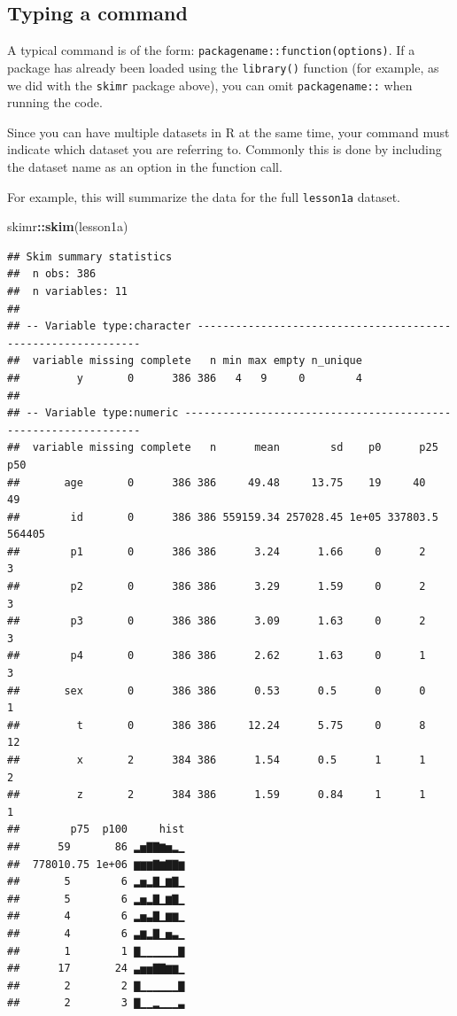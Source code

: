 \documentclass[]{book}
\newenvironment{Shaded}{\begin{snugshade}}{\end{snugshade}}
\newcommand{\KeywordTok}[1]{\textcolor[rgb]{0.13,0.29,0.53}{\textbf{#1}}}
\newcommand{\NormalTok}[1]{#1}
\newcommand{\OperatorTok}[1]{\textcolor[rgb]{0.81,0.36,0.00}{\textbf{#1}}}
\begin{document}
\hypertarget{typing-a-command-1}{%
\subsection{Typing a command}\label{typing-a-command-1}}

A typical command is of the form:
\texttt{packagename::function(options)}. If a package has already been
loaded using the \texttt{library()} function (for example, as we did
with the \texttt{skimr} package above), you can omit
\texttt{packagename::} when running the code.

Since you can have multiple datasets in R at the same time, your command
must indicate which dataset you are referring to. Commonly this is done
by including the dataset name as an option in the function call.

For example, this will summarize the data for the full \texttt{lesson1a}
dataset.

\begin{Shaded}
\begin{Highlighting}[]
\NormalTok{skimr}\OperatorTok{::}\KeywordTok{skim}\NormalTok{(lesson1a)}
\end{Highlighting}
\end{Shaded}

\begin{verbatim}
## Skim summary statistics
##  n obs: 386 
##  n variables: 11 
## 
## -- Variable type:character -------------------------------------------------------------
##  variable missing complete   n min max empty n_unique
##         y       0      386 386   4   9     0        4
## 
## -- Variable type:numeric ---------------------------------------------------------------
##  variable missing complete   n      mean        sd    p0      p25    p50
##       age       0      386 386     49.48     13.75    19     40       49
##        id       0      386 386 559159.34 257028.45 1e+05 337803.5 564405
##        p1       0      386 386      3.24      1.66     0      2        3
##        p2       0      386 386      3.29      1.59     0      2        3
##        p3       0      386 386      3.09      1.63     0      2        3
##        p4       0      386 386      2.62      1.63     0      1        3
##       sex       0      386 386      0.53      0.5      0      0        1
##         t       0      386 386     12.24      5.75     0      8       12
##         x       2      384 386      1.54      0.5      1      1        2
##         z       2      384 386      1.59      0.84     1      1        1
##        p75  p100     hist
##      59       86 ▂▅▇▇▆▅▂▁
##  778010.75 1e+06 ▆▆▆▇▆▇▇▆
##       5        6 ▂▅▂▇▁▆▇▁
##       5        6 ▂▅▂▇▁▆▇▁
##       4        6 ▂▅▃▇▁▆▆▁
##       4        6 ▃▆▂▇▁▅▃▁
##       1        1 ▇▁▁▁▁▁▁▇
##      17       24 ▃▅▅▇▇▆▆▁
##       2        2 ▇▁▁▁▁▁▁▇
##       2        3 ▇▁▁▂▁▁▁▃
\end{verbatim}
\end{document}
